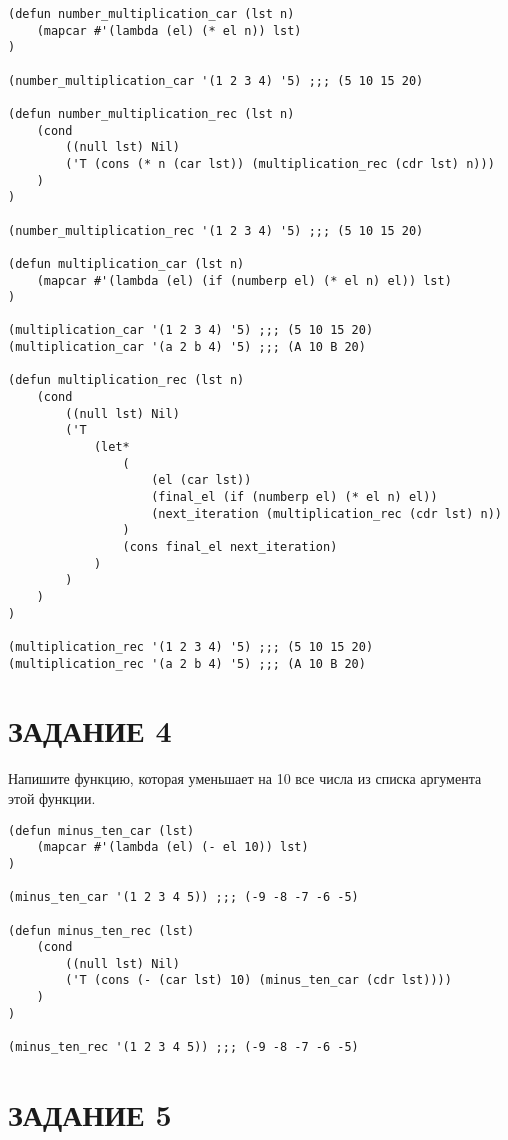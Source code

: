 \begin{lstlisting}
(defun number_multiplication_car (lst n)
    (mapcar #'(lambda (el) (* el n)) lst)
)

(number_multiplication_car '(1 2 3 4) '5) ;;; (5 10 15 20)

(defun number_multiplication_rec (lst n)
    (cond
        ((null lst) Nil)
        ('T (cons (* n (car lst)) (multiplication_rec (cdr lst) n)))
    )
)

(number_multiplication_rec '(1 2 3 4) '5) ;;; (5 10 15 20)

(defun multiplication_car (lst n)
    (mapcar #'(lambda (el) (if (numberp el) (* el n) el)) lst)
)

(multiplication_car '(1 2 3 4) '5) ;;; (5 10 15 20)
(multiplication_car '(a 2 b 4) '5) ;;; (A 10 B 20)

(defun multiplication_rec (lst n)
    (cond
        ((null lst) Nil)
        ('T
            (let*
                (
                    (el (car lst))
                    (final_el (if (numberp el) (* el n) el))
                    (next_iteration (multiplication_rec (cdr lst) n))
                )
                (cons final_el next_iteration)
            )
        )
    )
)

(multiplication_rec '(1 2 3 4) '5) ;;; (5 10 15 20)
(multiplication_rec '(a 2 b 4) '5) ;;; (A 10 B 20)
\end{lstlisting}

\section{ЗАДАНИЕ 4}

Напишите функцию, которая уменьшает на 10 все числа из списка
аргумента этой функции.

\begin{lstlisting}
(defun minus_ten_car (lst)
    (mapcar #'(lambda (el) (- el 10)) lst)
)

(minus_ten_car '(1 2 3 4 5)) ;;; (-9 -8 -7 -6 -5)

(defun minus_ten_rec (lst)
    (cond
        ((null lst) Nil)
        ('T (cons (- (car lst) 10) (minus_ten_car (cdr lst))))
    )
)

(minus_ten_rec '(1 2 3 4 5)) ;;; (-9 -8 -7 -6 -5)
\end{lstlisting}

\section{ЗАДАНИЕ 5}

